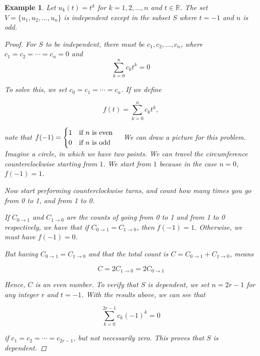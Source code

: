 \documentclass{book}
\newtheorem{example}{Example}[section]
\begin{document}
\begin{example}
    Let $u_k(t)=t^{k}$ for $k=1,2,\dots, n$ and $t\in \mathbb{R}$. The set $V=\{u_1,u_2,\dots, u_n\}$ is independent except in the subset $S$ where $t=-1$ and $n$ is odd.

    \begin{proof}
        For $S$ to be independent, there must be $c_1,c_2,\dots, c_n$, where $c_1 = c_2 = \cdots = c_n =0$ and
        \[
            \sum_{k=0}^{n}{c_k t^{k}} = 0
        \]

        To solve this, we set $c_0=c_1=\cdots=c_n$. If we define

        \[
            f(t)=\sum_{k=0}^{n}{c_k t^{k}},
        \]

        note that $f(-1)=\begin{cases}1\quad \textnormal{if $n$ is even}\\0 \quad \textnormal{if $n$ is odd}\end{cases}$
        We can draw a picture for this problem. Imagine a circle, in which we have two points. We can travel the circumference
        counterclockwise starting from $1$. We start from $1$ because in the case $n=0$, $f(-1)=1$.

        \begin{center}
        \end{center}

        Now start performing counterclockwise turns, and count how many times you go
        from 0 to 1, and from 1 to 0.

        If $C_{0\to 1}$ and $C_{1 \to 0}$ are the counts of going from 0 to 1 and from
        1 to 0 respectively, we have that if $C_{0\to 1}=C_{1\to 0}$, then $f(-1)=1$.
        Otherwise, we must have $f(-1)=0$.

        But having $C_{0\to 1}=C_{1\to 0}$ and that the total count is $C=C_{0\to
            1}+C_{1\to 0}$, means

        \[
            C=2C_{1\to 0}=2C_{0\to 1}
        \]

        Hence, $C$ is an even number. To verify that $S$ is dependent, we set $n=2r-1$
        for any integer $r$ and $t=-1$. With the results above, we can see that

        \[
            \sum_{k=0}^{2r-1}{c_k {(-1)}^{k}}=0
        \]

        if $c_1=c_2=\cdots=c_{2r-1}$, but not necessarily zero. This proves that $S$ is
        dependent.
    \end{proof}
\end{example}
\end{document}

